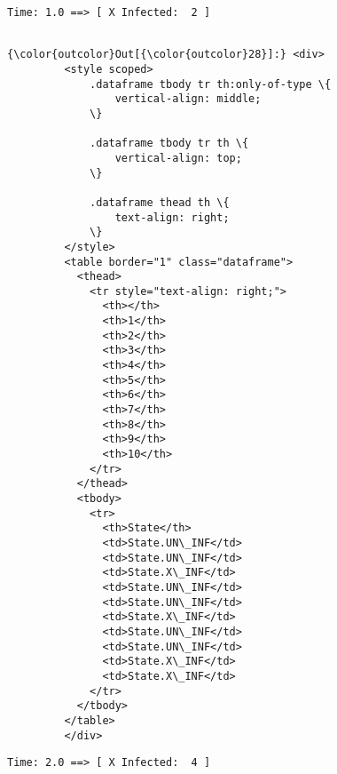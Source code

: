 \documentclass[11pt]{article}
\begin{document}
    \begin{Verbatim}[commandchars=\\\{\}]
Time: 1.0 ==> [ X Infected:  2 ] 


    \end{Verbatim}

\begin{Verbatim}[commandchars=\\\{\}]
{\color{outcolor}Out[{\color{outcolor}28}]:} <div>
         <style scoped>
             .dataframe tbody tr th:only-of-type \{
                 vertical-align: middle;
             \}
         
             .dataframe tbody tr th \{
                 vertical-align: top;
             \}
         
             .dataframe thead th \{
                 text-align: right;
             \}
         </style>
         <table border="1" class="dataframe">
           <thead>
             <tr style="text-align: right;">
               <th></th>
               <th>1</th>
               <th>2</th>
               <th>3</th>
               <th>4</th>
               <th>5</th>
               <th>6</th>
               <th>7</th>
               <th>8</th>
               <th>9</th>
               <th>10</th>
             </tr>
           </thead>
           <tbody>
             <tr>
               <th>State</th>
               <td>State.UN\_INF</td>
               <td>State.UN\_INF</td>
               <td>State.X\_INF</td>
               <td>State.UN\_INF</td>
               <td>State.UN\_INF</td>
               <td>State.X\_INF</td>
               <td>State.UN\_INF</td>
               <td>State.UN\_INF</td>
               <td>State.X\_INF</td>
               <td>State.X\_INF</td>
             </tr>
           </tbody>
         </table>
         </div>
\end{Verbatim}
            
    \begin{Verbatim}[commandchars=\\\{\}]
Time: 2.0 ==> [ X Infected:  4 ] 


    \end{Verbatim}
\end{document}
